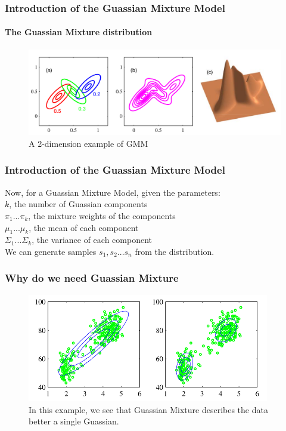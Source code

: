 \documentclass{beamer}
\begin{document}
\begin{frame}
\frametitle{Introduction of the Guassian Mixture Model}
\framesubtitle{The Guassian Mixture distribution}
\begin{figure}
\includegraphics[width=330pt]{GMM-example.png}\\
A 2-dimension example of GMM
\end{figure}
\end{frame}

\begin{frame}
\frametitle{Introduction of the Guassian Mixture Model}
Now, for a Guassian Mixture Model, given the parameters:\\
$k$, the number of Guassian components\\
$\pi_1...\pi_k$, the mixture weights of the components\\
$\mu_1...\mu_k$, the mean of each component\\
$\Sigma_1...\Sigma_k$, the variance of each component\\
We can generate samples $s_1,s_2...s_n$ from the distribution.
\end{frame}

\begin{frame}
\frametitle{Why do we need Guassian Mixture}
\begin{figure}
\includegraphics[width=300pt]{GMMbetterG.png}\\
In this example, we see that Guassian Mixture describes the data better a single Guassian.
\end{figure}
\end{frame}
\end{document}
